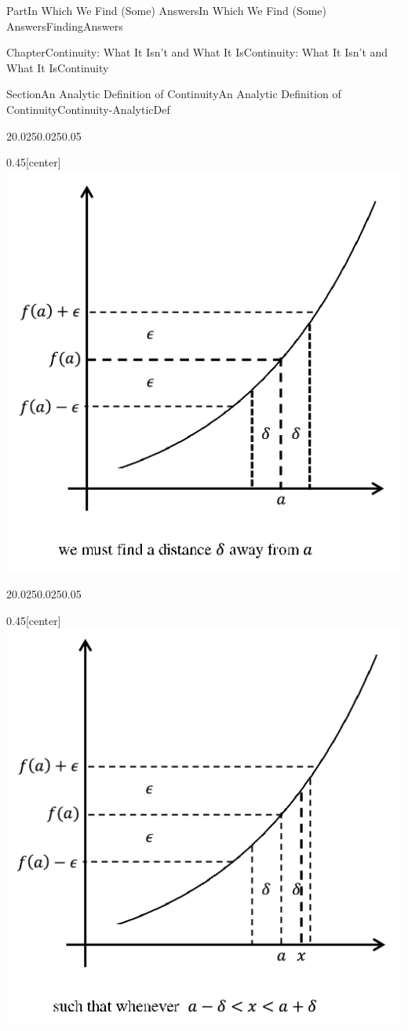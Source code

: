 \documentclass[oneside,10pt,]{book}
\numberwithin{equation}{part}
\begin{document}
\begin{partptx}{Part}{In Which We Find (Some) Answers}{}{In Which We Find (Some) Answers}{}{}{FindingAnswers}
\begin{chapterptx}{Chapter}{Continuity: What It Isn't and What It Is}{}{Continuity: What It Isn't and What It Is}{}{}{Continuity}
\begin{sectionptx}{Section}{An Analytic Definition of Continuity}{}{An Analytic Definition of Continuity}{}{}{Continuity-AnalyticDef}
\begin{sidebyside}{2}{0.025}{0.025}{0.05}
\begin{sbspanel}{0.45}[center]
\noindent\includegraphics[width=\linewidth]{external/images/Ch5fig3b.png}
\end{sbspanel}%
\end{sidebyside}%
\begin{sidebyside}{2}{0.025}{0.025}{0.05}%
\begin{sbspanel}{0.45}[center]%
\noindent\includegraphics[width=\linewidth]{external/images/Ch5fig3c.png}

\end{sbspanel}
\end{sidebyside}
\end{sectionptx}
\end{chapterptx}
\end{partptx}
\end{document}
